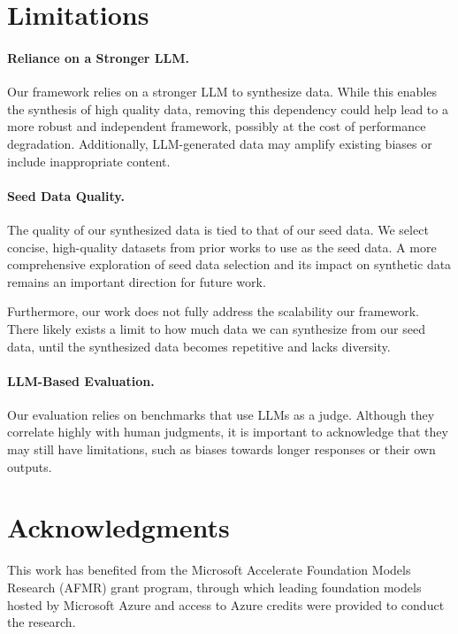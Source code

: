 \section{Limitations}

\paragraph{Reliance on a Stronger LLM. }
Our framework relies on a stronger LLM to synthesize data. While this enables the synthesis of high quality data, removing this dependency could help lead to a more robust and independent framework, possibly at the cost of performance degradation. Additionally, LLM-generated data may amplify existing biases or include inappropriate content.

\paragraph{Seed Data Quality. }
The quality of our synthesized data is tied to that of our seed data. We select concise, high-quality datasets from prior works to use as the seed data. A more comprehensive exploration of seed data selection and its impact on synthetic data remains an important direction for future work.

Furthermore, our work does not fully address the scalability our framework. There likely exists a limit to how much data we can synthesize from our seed data, until the synthesized data becomes repetitive and lacks diversity.

\paragraph{LLM-Based Evaluation. }
Our evaluation relies on benchmarks that use LLMs as a judge. Although they correlate highly with human judgments, it is important to acknowledge that they may still have limitations, such as biases towards longer responses or their own outputs.


\section{Acknowledgments}
This work has benefited from the Microsoft Accelerate Foundation Models Research (AFMR) grant program, through which leading foundation models hosted by Microsoft Azure and access to Azure credits were provided to conduct the research.
